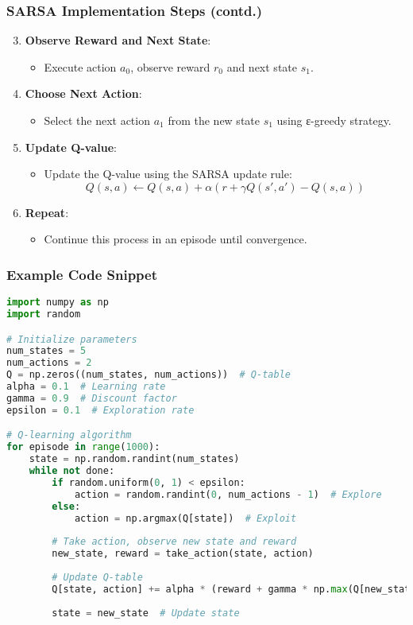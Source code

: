 \documentclass{beamer}
\begin{document}
\begin{frame}
    \frametitle{SARSA Implementation Steps (contd.)}
    \begin{enumerate}
        \setcounter{enumi}{2}
        \item \textbf{Observe Reward and Next State}:
            \begin{itemize}
                \item Execute action \( a_0 \), observe reward \( r_0 \) and next state \( s_1 \).
            \end{itemize}
        \item \textbf{Choose Next Action}:
            \begin{itemize}
                \item Select the next action \( a_1 \) from the new state \( s_1 \) using ε-greedy strategy.
            \end{itemize}
        \item \textbf{Update Q-value}:
            \begin{itemize}
                \item Update the Q-value using the SARSA update rule:
                \[
                Q(s, a) \leftarrow Q(s, a) + \alpha \left( r + \gamma Q(s', a') - Q(s, a) \right)
                \]
            \end{itemize}
        \item \textbf{Repeat}:
            \begin{itemize}
                \item Continue this process in an episode until convergence.
            \end{itemize}
    \end{enumerate}
\end{frame}

\begin{frame}[fragile]
    \frametitle{Example Code Snippet}
    \begin{lstlisting}[language=Python, basicstyle=\ttfamily]
import numpy as np
import random

# Initialize parameters
num_states = 5
num_actions = 2
Q = np.zeros((num_states, num_actions))  # Q-table
alpha = 0.1  # Learning rate
gamma = 0.9  # Discount factor
epsilon = 0.1  # Exploration rate

# Q-learning algorithm
for episode in range(1000):
    state = np.random.randint(num_states)
    while not done:
        if random.uniform(0, 1) < epsilon:
            action = random.randint(0, num_actions - 1)  # Explore
        else:
            action = np.argmax(Q[state])  # Exploit
        
        # Take action, observe new state and reward
        new_state, reward = take_action(state, action) 
        
        # Update Q-table
        Q[state, action] += alpha * (reward + gamma * np.max(Q[new_state]) - Q[state, action])
        
        state = new_state  # Update state
    \end{lstlisting}
\end{frame}
\end{document}
